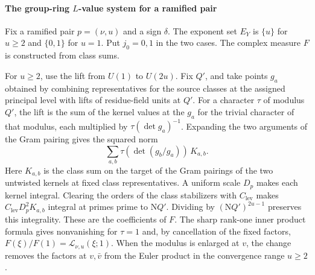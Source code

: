 \paragraph{The group-ring \(L\)-value system for a ramified pair}
Fix a ramified pair \(p=(\nu,u)\) and a sign \(\delta\).
The exponent set \(E_Y\) is \(\{u\}\) for \(u\ge2\) and \(\{0,1\}\) for \(u=1\).
Put \(j_0=0,1\) in the two cases. The complex measure \(F\) is constructed from class sums.

For \(u\ge2\), use the lift from \(U(1)\) to \(U(2u)\). Fix \(Q'\), and take points \(g_a\)
obtained by combining representatives for the source classes at the assigned principal level with
lifts of residue-field units at \(Q'\). For a character \(\tau\) of modulus \(Q'\), the lift is the
sum of the kernel values at the \(g_a\) for the trivial character of that modulus, each multiplied
by \(\tau(\det g_a)^{-1}\). Expanding the two arguments of the Gram pairing gives the squared norm
\[
 \sum_{a,b}\tau(\det(g_b/g_a))\,K_{a,b}.
\]
Here \(K_{a,b}\) is the class sum on the target of the Gram pairings of the two untwisted kernels
at fixed class representatives. A uniform scale \(D_p\) makes each kernel integral.
Clearing the orders of the class stabilizers with \(C_{\mathrm{lev}}\) makes
\(C_{\mathrm{lev}}D_p^2 K_{a,b}\) integral at primes prime to \(\mathrm NQ'\).
Dividing by \((\mathrm NQ')^{2u-1}\) preserves this integrality. These are the coefficients
of \(F\). The sharp rank-one inner product formula gives nonvanishing for \(\tau=1\)
and, by cancellation of the fixed factors, \(F(\xi)/F(1)=\mathcal L_{\nu,u}(\xi;1)\).
When the modulus is enlarged at \(v\), the change removes the factors at \(v,\bar v\)
from the Euler product in the convergence range \(u\ge2\).

